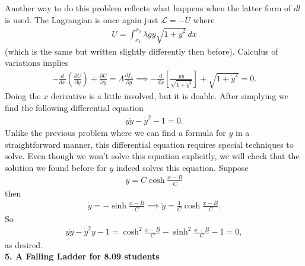 \documentclass{article}
\theoremstyle{definition}
\newcommand{\p}{\partial}
\newcommand{\lag}{\mathcal{L}}
\newcommand{\f}[2]{\frac{#1}{#2}}
\newcommand{\lp}{\left(}
\newcommand{\rp}{\right)}
\newcommand{\lb}{\left[}
\newcommand{\rb}{\right]}
\begin{document}
Another way to do this problem reflects what happens when the latter form of $dl$ is used. The Lagrangian is once again just $\lag = -U$ where
\begin{align*}
U = \int_{x_1}^{x_2} \lambda g y\sqrt{1+\dot y^2}\,dx
\end{align*}
(which is the same but written slightly differently then before). Calculus of variations implies
\begin{align*}
-\f{d}{dx}\lp \f{\p U}{\p \dot{y}} \rp + \f{\p U}{\p y} = \Lambda \f{\p f_1}{\p y} 
\implies 
-\f{d}{dx}\lb \f{y\dot y}{\sqrt{1+\dot y^2}} \rb + \sqrt{1+\dot y^2} = 0.
\end{align*}
Doing the $x$ derivative is a little involved, but it is doable. After simplying we find the following differential equation
\begin{align*}
y \ddot y -  \dot y^2 - 1= 0.
\end{align*}
Unlike the previous problem where we can find a formula for $y$ in a straightforward manner, this differential equation requires special techniques to solve. Even though we won't solve this equation explicitly, we will check that the solution we found before for $y$ indeed solves this equation. Suppose 
\begin{align*}
y = C \cosh \f{x-B}{C}
\end{align*}
then 
\begin{align*}
\dot y = -\sinh \f{x-B}{C} \implies \ddot y = \f{1}{C}\cosh \f{x-B}{C}.
\end{align*}
So 
\begin{align*}
y \ddot y -  \dot y^2y - 1 = \cosh^2 \f{x-B}{C} - \sinh^2 \f{x-B}{C} - 1 = 0,
\end{align*}
as desired. \\







\noindent \textbf{5. A Falling Ladder for 8.09 students}\\
\end{document}
